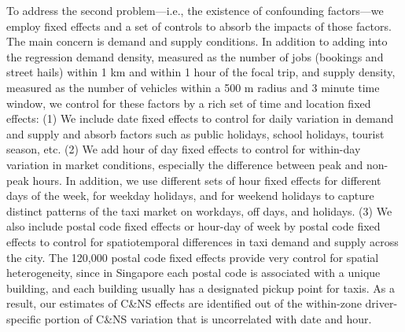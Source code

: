 \documentclass[reviewmode]{restat}
\begin{document}
To address the second problem---i.e., the existence of confounding factors---we employ fixed effects and a
set of controls to absorb the impacts of those factors. The main concern is demand and supply conditions.
In addition to adding  into the regression demand density, measured as the number of jobs (bookings and street 
hails) within 1 km and within 1 hour of the focal trip, and supply density, measured as the number of vehicles
within a 500 m radius and 3 minute time window, we control for these factors by a rich set of time and
location fixed effects: (1) We include date fixed effects to control for daily variation in demand and 
supply and absorb factors such as public holidays, school holidays, tourist season, etc. (2) We add hour 
of day fixed effects to control for within-day variation in market conditions, especially the difference 
between peak and non-peak hours. In addition, we use different sets of hour fixed effects for different days 
of the week, for weekday holidays, and for weekend holidays to capture distinct patterns of the taxi market on 
workdays, off days, and holidays. 
(3)  We also include postal code fixed effects or hour-day of week by postal code fixed effects to control 
for spatiotemporal differences in taxi demand and supply across the city.
The 120,000 postal code fixed effects provide very control for spatial 
heterogeneity, since in Singapore each postal code is associated with a unique building, and each building
usually has a designated pickup point for taxis. As a result, our estimates of C\&NS effects are identified 
out of the within-zone driver-specific portion of C\&NS variation that is uncorrelated with date and hour. 
\end{document}
